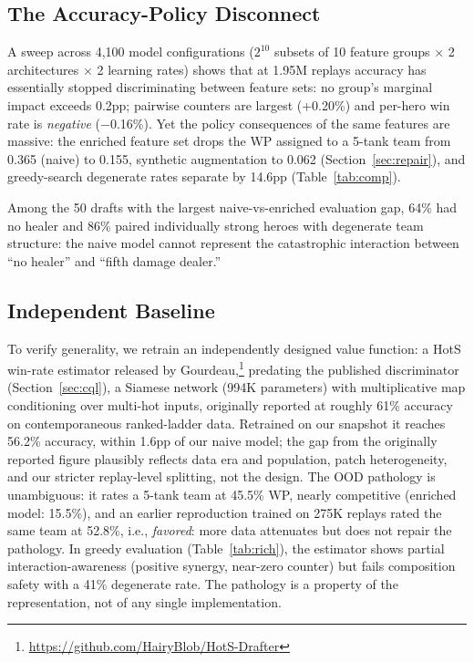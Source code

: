 \documentclass[journal]{IEEEtran}
\begin{document}
\subsection{The Accuracy-Policy Disconnect}

A sweep across 4,100 model configurations ($2^{10}$ subsets of 10 feature groups $\times$ 2 architectures $\times$ 2 learning rates) shows that at 1.95M replays accuracy has essentially stopped discriminating between feature sets: no group's marginal impact exceeds 0.2pp; pairwise counters are largest (+0.20\%) and per-hero win rate is \textit{negative} ($-$0.16\%). Yet the policy consequences of the same features are massive: the enriched feature set drops the WP assigned to a 5-tank team from 0.365 (naive) to 0.155, synthetic augmentation to 0.062 (Section~\ref{sec:repair}), and greedy-search degenerate rates separate by 14.6pp (Table~\ref{tab:comp}).

Among the 50 drafts with the largest naive-vs-enriched evaluation gap, 64\% had no healer and 86\% paired individually strong heroes with degenerate team structure: the naive model cannot represent the catastrophic interaction between ``no healer'' and ``fifth damage dealer.''

\subsection{Independent Baseline}
\label{sec:gourdeau}

To verify generality, we retrain an independently designed value function: a HotS win-rate estimator released by Gourdeau,\footnote{\url{https://github.com/HairyBlob/HotS-Drafter}} predating the published discriminator (Section~\ref{sec:cql}), a Siamese network (994K parameters) with multiplicative map conditioning over multi-hot inputs, originally reported at roughly 61\% accuracy on contemporaneous ranked-ladder data. Retrained on our snapshot it reaches 56.2\% accuracy, within 1.6pp of our naive model; the gap from the originally reported figure plausibly reflects data era and population, patch heterogeneity, and our stricter replay-level splitting, not the design. The OOD pathology is unambiguous: it rates a 5-tank team at 45.5\% WP, nearly competitive (enriched model: 15.5\%), and an earlier reproduction trained on 275K replays rated the same team at 52.8\%, i.e., \textit{favored}: more data attenuates but does not repair the pathology. In greedy evaluation (Table~\ref{tab:rich}), the estimator shows partial interaction-awareness (positive synergy, near-zero counter) but fails composition safety with a 41\% degenerate rate. The pathology is a property of the representation, not of any single implementation.
\end{document}
